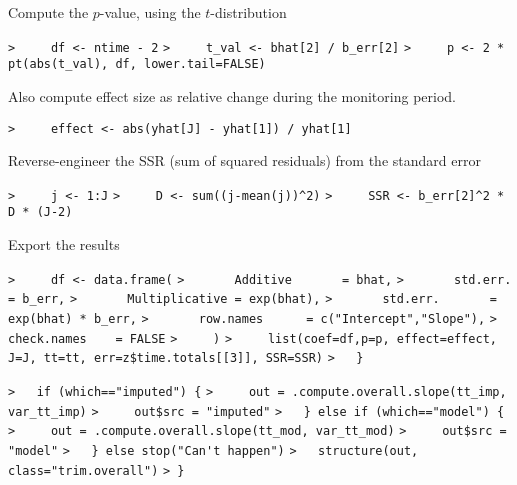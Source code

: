 \documentclass[a4paper]{article}
\begin{document}
Compute the $p$-value, using the $t$-distribution\par
\verb~>     df <- ntime - 2~\newline
\verb~>     t_val <- bhat[2] / b_err[2]~\newline
\verb~>     p <- 2 * pt(abs(t_val), df, lower.tail=FALSE)~\par


Also compute effect size as relative change during the monitoring period.\par
\verb~>     effect <- abs(yhat[J] - yhat[1]) / yhat[1]~\par


Reverse-engineer the SSR (sum of squared residuals) from the standard error\par
\verb~>     j <- 1:J~\newline
\verb~>     D <- sum((j-mean(j))^2)~\newline
\verb~>     SSR <- b_err[2]^2 * D * (J-2)~\par

Export the results\par
\verb~>     df <- data.frame(~\newline
\verb~>       Additive       = bhat,~\newline
\verb~>       std.err.       = b_err,~\newline
\verb~>       Multiplicative = exp(bhat),~\newline
\verb~>       std.err.       = exp(bhat) * b_err,~\newline
\verb~>       row.names      = c("Intercept","Slope"),~\newline
\verb~>       check.names    = FALSE~\newline
\verb~>     )~\newline
\verb~>     list(coef=df,p=p, effect=effect, J=J, tt=tt, err=z$time.totals[[3]], SSR=SSR)~\newline
\verb~>   }~\par

\verb~>   if (which=="imputed") {~\newline
\verb~>     out = .compute.overall.slope(tt_imp, var_tt_imp)~\newline
\verb~>     out$src = "imputed"~\newline
\verb~>   } else if (which=="model") {~\newline
\verb~>     out = .compute.overall.slope(tt_mod, var_tt_mod)~\newline
\verb~>     out$src = "model"~\newline
\verb~>   } else stop("Can't happen")~\newline
\verb~>   structure(out, class="trim.overall")~\newline
\verb~> }~\par
\end{document}
